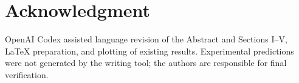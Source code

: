 \documentclass[conference,a4paper]{IEEEtran}
\begin{document}
\section*{Acknowledgment}
OpenAI Codex assisted language revision of the Abstract and Sections I--V, LaTeX preparation, and plotting of existing results. Experimental predictions were not generated by the writing tool; the authors are responsible for final verification.



\end{document}
